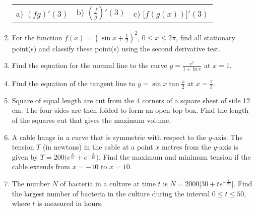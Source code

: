 \documentclass{article}
\begin{document}
\begin{enumerate}
\begin{tabular}{lll}
a) $(fg)'(3)$ \hspace{2cm} &
b) $\left(\frac f g\right)'(3)$ \hspace{2cm} &
c) $\big[f(g(x))\big]'(3)$ \\
\end{tabular}
\vspace{9cm}
\item For the function $f(x)=\left(\sin x+\frac 1 2\right)^2$,
$0\le x\le 2\pi$, find all stationary point(s) and classify
these point(s) using the second derivative test.
\vspace{9cm}
\item Find the equation for the normal line to the curve
$y=\frac{e^x}{1+\ln x}$ at $x=1$.
\vspace{9cm}
\item Find the equation of the tangent line to $y=\sin x\tan \frac x 2$
at $x=\frac \pi 3$.
\vspace{9cm}
\item Square of equal length are cut from the 4 corners of a square
sheet of side 12 cm. The four sides are then folded to form an open top
box. Find the length of the squares cut that gives the maximum volume.
\vspace{9cm}
\item A cable hangs in a curve that is symmetric with respect to the
$y$-axis. The tension $T$ (in newtons) in the cable at a point $x$
metres from the $y$-axis is given by $T=200\big(e^\frac x {10} +
e^{-\frac x {10}}\big)$. Find the maximum and minimum tension if the
cable extends from $x=-10$ to $x=10$.
\vspace{9cm}
\item The number $N$ of bacteria in a culture at time $t$
is $N=2000\big[30+te^{-\frac t {20}}\big]$. Find the largest number
of bacteria in the culture during the interval $0\le t\le 50$, where
$t$ is measured in hours.
\end{enumerate}
\end{document}
